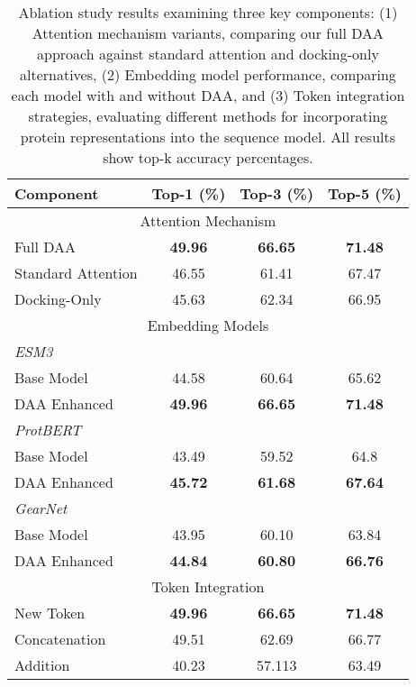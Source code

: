 \begin{table}[ht]
\caption{Ablation study results examining three key components: (1) Attention mechanism variants, comparing our full DAA approach against standard attention and docking-only alternatives, (2) Embedding model performance, comparing each model with and without DAA, and (3) Token integration strategies, evaluating different methods for incorporating protein representations into the sequence model. All results show top-k accuracy percentages.}
\label{tab:ablation-full}
\centering
\begin{tabular}{lccc}
\toprule
\textbf{Component} & \textbf{Top-1 (\%)} & \textbf{Top-3 (\%)} & \textbf{Top-5 (\%)} \\
\midrule
\multicolumn{4}{c}{Attention Mechanism} \\ \hline
Full DAA & \textbf{49.96} & \textbf{66.65} & \textbf{71.48} \\
Standard Attention & 46.55 & 61.41 & 67.47 \\
Docking-Only & 45.63 & 62.34 & 66.95 \\
\midrule
\multicolumn{4}{c}{Embedding Models} \\ \hline
\multicolumn{4}{l}{\textit{ESM3}} \\
\quad \quad Base Model  &44.58 &60.64 &65.62 \\
\quad \quad DAA Enhanced & \textbf{49.96} & \textbf{66.65} & \textbf{71.48} \\
\multicolumn{4}{l}{\textit{ProtBERT}} \\
\quad \quad Base Model &43.49 &59.52 &64.8 \\
\quad \quad DAA Enhanced &\textbf{ 45.72} & \textbf{61.68} & \textbf{67.64} \\
\multicolumn{4}{l}{\textit{GearNet}} \\
\quad \quad Base Model &43.95 &60.10 &63.84 \\
\quad \quad DAA Enhanced & \textbf{44.84} & \textbf{60.80} & \textbf{66.76} \\
\midrule
\multicolumn{4}{c}{Token Integration} \\ \hline
New Token & \textbf{49.96} & \textbf{66.65} & \textbf{71.48} \\
Concatenation & 49.51 & 62.69 & 66.77 \\
Addition & 40.23 & 57.113 & 63.49 \\
\bottomrule
\end{tabular}
\end{table}